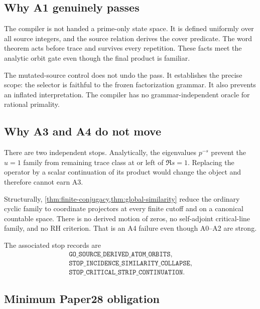 \subsection{Why A1 genuinely passes}

The compiler is not handed a prime-only state space. It is defined uniformly
over all source integers, and the source relation derives the cover predicate.
The word theorem acts before trace and survives every repetition. These facts
meet the analytic orbit gate even though the final product is familiar.

The mutated-source control does not undo the pass. It establishes the precise
scope: the selector is faithful to the frozen factorization grammar. It also
prevents an inflated interpretation. The compiler has no grammar-independent
oracle for rational primality.

\subsection{Why A3 and A4 do not move}

There are two independent stops. Analytically, the eigenvalues \(p^{-s}\)
prevent the \(u=1\) family from remaining trace class at or left of
\(\Re s=1\). Replacing the operator by a scalar continuation of its product
would change the object and therefore cannot earn A3.

Structurally, \cref{thm:finite-conjugacy,thm:global-similarity} reduce the
ordinary cyclic family to coordinate projectors at every finite cutoff and on
a canonical countable space. There is no derived motion of zeros, no
self-adjoint critical-line family, and no RH criterion. That is an A4 failure
even though A0--A2 are strong.

The associated stop records are
\begin{equation*}
\begin{gathered}
\texttt{GO\_SOURCE\_DERIVED\_ATOM\_ORBITS},\\
\texttt{STOP\_INCIDENCE\_SIMILARITY\_COLLAPSE},\\
\texttt{STOP\_CRITICAL\_STRIP\_CONTINUATION}.
\end{gathered}
\end{equation*}

\subsection{Minimum Paper28 obligation}
\label{sec:paper28-obligation}

